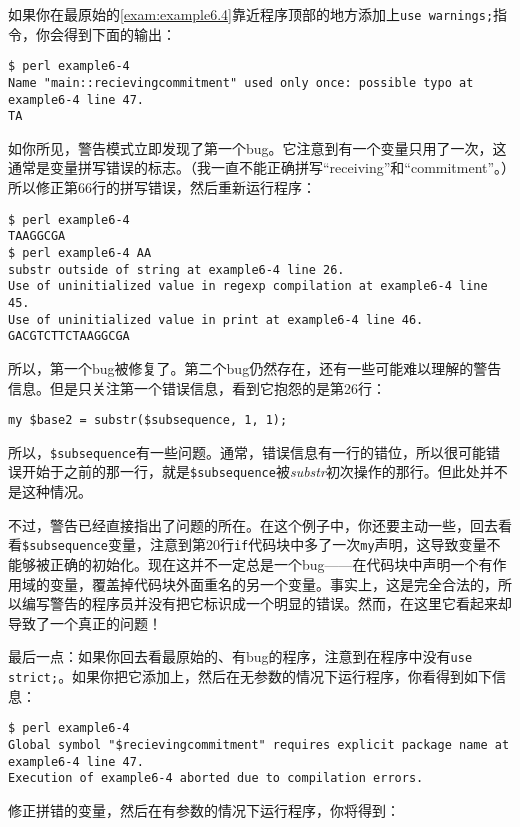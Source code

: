 如果你在最原始的\autoref{exam:example6.4}靠近程序顶部的地方添加上\verb|use warnings;|指令，你会得到下面的输出：

\begin{lstlisting}
$ perl example6-4 
Name "main::recievingcommitment" used only once: possible typo at example6-4 line 47.
TA 
\end{lstlisting}

如你所见，警告模式立即发现了第一个bug。它注意到有一个变量只用了一次，这通常是变量拼写错误的标志。（我一直不能正确拼写“receiving”和“commitment”。）所以修正第66行的拼写错误，然后重新运行程序：

\begin{lstlisting}
$ perl example6-4 
TAAGGCGA
$ perl example6-4 AA
substr outside of string at example6-4 line 26.
Use of uninitialized value in regexp compilation at example6-4 line 45.
Use of uninitialized value in print at example6-4 line 46.
GACGTCTTCTAAGGCGA   
\end{lstlisting}

所以，第一个bug被修复了。第二个bug仍然存在，还有一些可能难以理解的警告信息。但是只关注第一个错误信息，看到它抱怨的是第26行：

\begin{lstlisting}
my $base2 = substr($subsequence, 1, 1);
\end{lstlisting}

所以，\verb|$subsequence|有一些问题。通常，错误信息有一行的错位，所以很可能错误开始于之前的那一行，就是\verb|$subsequence|被\textit{substr}初次操作的那行。但此处并不是这种情况。

不过，警告已经直接指出了问题的所在。在这个例子中，你还要主动一些，回去看看\verb|$subsequence|变量，注意到第20行\verb|if|代码块中多了一次\verb|my|声明，这导致变量不能够被正确的初始化。现在这并不一定总是一个bug——在代码块中声明一个有作用域的变量，覆盖掉代码块外面重名的另一个变量。事实上，这是完全合法的，所以编写警告的程序员并没有把它标识成一个明显的错误。然而，在这里它看起来却导致了一个真正的问题！

最后一点：如果你回去看最原始的、有bug的程序，注意到在程序中没有\verb|use strict;|。如果你把它添加上，然后在无参数的情况下运行程序，你看得到如下信息：

\begin{lstlisting}
$ perl example6-4   
Global symbol "$recievingcommitment" requires explicit package name at example6-4 line 47.
Execution of example6-4 aborted due to compilation errors.
\end{lstlisting}

修正拼错的变量，然后在有参数的情况下运行程序，你将得到：

